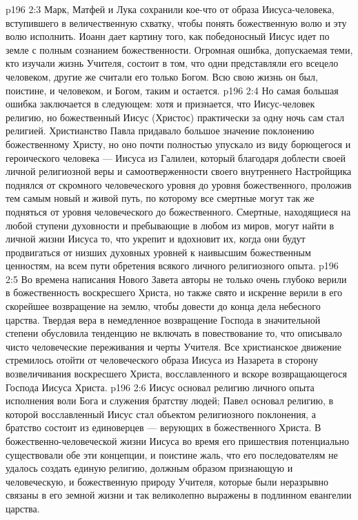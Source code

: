 \vs p196 2:3 Марк, Матфей и Лука сохранили кое\hyp{}что от образа Иисуса\hyp{}человека, вступившего в величественную схватку, чтобы понять божественную волю и эту волю исполнить. Иоанн дает картину того, как победоносный Иисус идет по земле с полным сознанием божественности. Огромная ошибка, допускаемая теми, кто изучали жизнь Учителя, состоит в том, что одни представляли его всецело человеком, другие же считали его только Богом. Всю свою жизнь он был, поистине, и человеком, и Богом, таким и остается.
\vs p196 2:4 Но самая большая ошибка заключается в следующем: хотя и признается, что Иисус\hyp{}человек  религию, но божественный Иисус (Христос) практически за одну ночь сам стал религией. Христианство Павла придавало большое значение поклонению божественному Христу, но оно почти полностью упускало из виду борющегося и героического человека --- Иисуса из Галилеи, который благодаря доблести своей личной религиозной веры и самоотверженности своего внутреннего Настройщика поднялся от скромного человеческого уровня до уровня божественного, проложив тем самым новый и живой путь, по которому все смертные могут так же подняться от уровня человеческого до божественного. Смертные, находящиеся на любой ступени духовности и пребывающие в любом из миров, могут найти в личной жизни Иисуса то, что укрепит и вдохновит их, когда они будут продвигаться от низших духовных уровней к наивысшим божественным ценностям, на всем пути обретения всякого личного религиозного опыта.
\vs p196 2:5 Во времена написания Нового Завета авторы не только очень глубоко верили в божественность воскресшего Христа, но также свято и искренне верили в его скорейшее возвращение на землю, чтобы довести до конца дела небесного царства. Твердая вера в немедленное возвращение Господа в значительной степени обусловила тенденцию не включать в повествование то, что описывало чисто человеческие переживания и черты Учителя. Все христианское движение стремилось отойти от человеческого образа Иисуса из Назарета в сторону возвеличивания воскресшего Христа, восславленного и вскоре возвращающегося Господа Иисуса Христа.
\vs p196 2:6 \pc Иисус основал религию личного опыта исполнения воли Бога и служения братству людей; Павел основал религию, в которой восславленный Иисус стал объектом религиозного поклонения, а братство состоит из единоверцев --- верующих в божественного Христа. В божественно\hyp{}человеческой жизни Иисуса во время его пришествия потенциально существовали обе эти концепции, и поистине жаль, что его последователям не удалось создать единую религию, должным образом признающую и человеческую, и божественную природу Учителя, которые были неразрывно связаны в его земной жизни и так великолепно выражены в подлинном евангелии царства.
